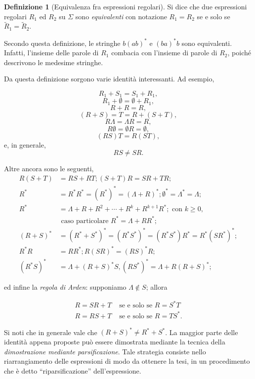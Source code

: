 \documentclass[10pt]{\classname}
\theoremstyle{definition}
\newtheorem{definizione}{Definizione}[section]
\theoremstyle{definition}
\begin{document}
\begin{definizione}[Equivalenza fra espressioni regolari]
Si dice che due espressioni regolari $R_1$ ed $R_2$ su $\Sigma$ sono
\emph{equivalenti} con notazione $R_1 = R_2$ se e solo se $\tilde R_1 = \tilde
R_2$.
\end{definizione}

Secondo questa definizione, le stringhe $b(ab)^*$ e $(ba)^* b$ sono
equivalenti. Infatti, l'insieme delle parole di $R_1$ combacia con l'insieme di
parole di $R_2$, poiché descrivono le medesime stringhe.

Da questa definizione sorgono varie identità interessanti. Ad esempio, 

$$  R_1 +  S_1 =  S_1 +  R_1,$$
$$  R_1 + \emptyset = \emptyset +  R_1,$$
$$  R +  R =  R,$$
$$ ( R +  S) =  T =  R + ( S +  T),$$
$$ R \Lambda  = \Lambda  R =  R,$$
$$ R \emptyset  = \emptyset  R = \emptyset,$$
$$( R  S)  T  =  R (  S  T),$$
e, in generale,
$$ R  S \neq  S  R.$$

Altre ancora sono le seguenti, 
\begin{align*}
    R(S + T) &= RS + RT;  (S + T)R = SR + TR; \\
    R^* &= R^* R^* = (R^*)^* = (\Lambda + R)^*; \emptyset^* = \Lambda^* = \Lambda; \\
    R^* &= \Lambda + R + R^2 + \cdots + R^k + R^{k+1}R^*; \mbox{ con } k \geq 0, \\
        &  \mbox{ caso particolare } R^* = \Lambda + RR^*; \\
    (R+S)^* &= (R^* + S^*)^* = (R^* S^*)^*  = (R^* S^*)R^* = R^*(SR^*)^*; \\
    R^* R &= RR^*;  R(SR)^* = (RS)^*R; \\
    (R^*S)^* &= \Lambda  + (R + S)^*S, (RS^*)^* =\Lambda + R(R + S)^*;
\end{align*}

ed infine la \emph{regola di Arden}: supponiamo $\Lambda \notin S$; allora

\begin{align*}
    R = SR + T & \mbox{ se e solo se } R = S^* T \\
    R = RS + T & \mbox{ se e solo se } R = T S^*.
\end{align*}

Si noti che in generale vale che $(R + S)^* \neq R^* + S^*$. La maggior parte
delle identità appena proposte può essere dimostrata mediante la tecnica della
\emph{dimostrazione mediante parsificazione}. Tale strategia consiste nello
riarrangiamento delle espressioni di modo da ottenere la tesi, in un
procedimento che è detto ``riparsificazione'' dell'espressione.
\end{document}
